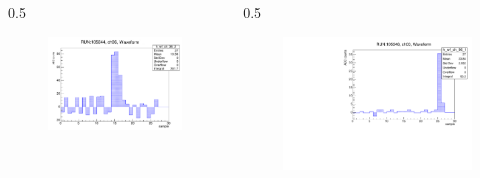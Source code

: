 \documentclass{beamer}
\begin{document}
\begin{frame}
         \vspace{-3mm}
        \begin{columns}
    \begin{column}{0.5\framewidth}
             \begin{figure}[!h]
          \centering
          \hspace*{-1em}
        \includegraphics[width=0.95\columnwidth]{figures/pdf/noise.pdf}
         \label{fig:normalhits}
    \end{figure}
    \end{column}
    \begin{column}{0.5\framewidth}
          \begin{figure}[!h]
          \centering
                \hspace*{-1em}
    \includegraphics[width=0.95\columnwidth]{figures/pdf/glitch.pdf}
         \label{fig:normalhits}
    \end{figure}

\end{column}
\end{columns}
\end{frame}
\end{document}
